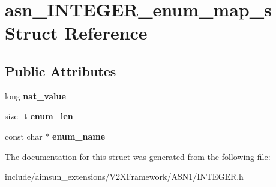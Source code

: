 \hypertarget{structasn__INTEGER__enum__map__s}{}\section{asn\+\_\+\+I\+N\+T\+E\+G\+E\+R\+\_\+enum\+\_\+map\+\_\+s Struct Reference}
\label{structasn__INTEGER__enum__map__s}
\subsection*{Public Attributes}
\begin{DoxyCompactItemize}
\item 
long {\bfseries nat\+\_\+value}\hypertarget{structasn__INTEGER__enum__map__s_ac14372db4e5264b3136df4fa02e8b18a}{}\label{structasn__INTEGER__enum__map__s_ac14372db4e5264b3136df4fa02e8b18a}

\item 
size\+\_\+t {\bfseries enum\+\_\+len}\hypertarget{structasn__INTEGER__enum__map__s_a55d4c6ad4011cae636878ede3a7de605}{}\label{structasn__INTEGER__enum__map__s_a55d4c6ad4011cae636878ede3a7de605}

\item 
const char $\ast$ {\bfseries enum\+\_\+name}\hypertarget{structasn__INTEGER__enum__map__s_a4f5807a4abd92ba2f1fff3233089f852}{}\label{structasn__INTEGER__enum__map__s_a4f5807a4abd92ba2f1fff3233089f852}

\end{DoxyCompactItemize}


The documentation for this struct was generated from the following file\+:\begin{DoxyCompactItemize}
\item 
include/aimsun\+\_\+extensions/\+V2\+X\+Framework/\+A\+S\+N1/I\+N\+T\+E\+G\+E\+R.\+h\end{DoxyCompactItemize}
